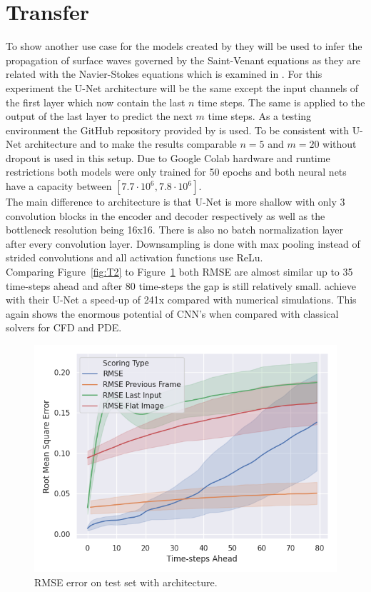 \documentclass[acmtog]{techreportacmart}
\begin{document}
\section{Transfer}
To show another use case for the models created by \cite{Thuerey20} they will be used to infer the propagation of surface waves governed by the Saint-Venant equations as they are related with the Navier-Stokes equations which is examined in \cite{Fotiadis2020}. For this experiment the U-Net architecture will be the same except the input channels of the first layer which now contain the last $n$ time steps. The same is applied to the output of the last layer to predict the next $m$ time steps. As a testing environment the GitHub repository provided by \cite{Fotiadis2020} is used. To be consistent with \cite{Fotiadis2020} U-Net architecture and to make the results comparable $n=5$ and $m=20$ without dropout is used in this setup. Due to Google Colab hardware and runtime restrictions both models were only trained for 50 epochs and both neural nets have a capacity between $[7.7 \cdot 10^6, 7.8 \cdot 10^6]$.\\
The main difference to \cite{Thuerey20} architecture is that \cite{Fotiadis2020} U-Net is more shallow with only 3 convolution blocks in the encoder and decoder respectively as well as the bottleneck resolution being 16x16. There is also no batch normalization layer after every convolution layer. Downsampling is done with max pooling instead of strided convolutions and all activation functions use ReLu. \\
Comparing Figure~\ref{fig:T2} to Figure~\ref{fig:T1} both RMSE are almost similar up to 35 time-steps ahead and after 80 time-steps the gap is still relatively small. \cite{Fotiadis2020} achieve with their U-Net a speed-up of 241x compared with numerical simulations. This again shows the enormous potential of CNN's when compared with classical solvers for CFD and PDE.

\begin{figure}[H]
  \includegraphics[width=.4\textwidth]{figures/transfer/DFP_Test_RMSE_Quality_start_15}
  \caption{RMSE error on test set with \cite{Thuerey20} architecture.}
  \label{fig:T1}
\end{figure}
\end{document}
